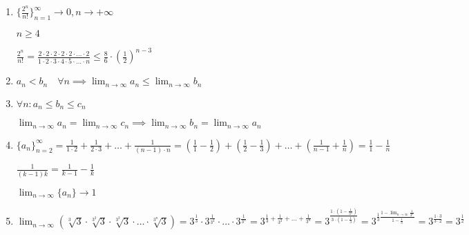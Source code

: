 \begin{enumerate}
\begin{proof}
            $n - 1 \geq \frac{n}{2} \quad (\forall n \geq 2)$
            
            $\lambda^n = (1 + \underbrace{\lambda - 1}_{> 0})^n
            = \sum_{i = 0}^{n} \binom{n}{i} (\lambda - 1)^i
            \overset{i = 2}{\geq} \binom{n}{2} (\lambda - 1)^2
            \overset{n \geq 2}{\geq} \underbracket{\frac{(\lambda - 1)^2}{4}}_\text{константа} \cdot n^2$

            $\lambda^n \geq \frac{(\lambda - 1)^2}{4} \cdot n^2$

            $\frac{n}{\lambda^n} \leq \frac{n}{\frac{(\lambda - 1)^2}{4}} \cdot \frac{1}{n^2} = \frac{4}{(\lambda - 1)^2} \cdot \frac{1}{n} \to 0$
        \end{proof}

    \item
        $\{\frac{2^n}{n!}\}_{n = 1}^\infty \to 0, n \to +\infty$

        $n \geq 4$

        $\frac{2^n}{n!} = \frac{2 \cdot 2 \cdot 2 \cdot 2 \cdot 2 \cdot \dots \cdot 2}{1 \cdot 2 \cdot 3 \cdot 4 \cdot 5 \cdot \dots \cdot n} 
        \leq \frac{8}{6} \cdot \left( \frac{1}{2} \right)^{n - 3}$

    \item
        $a_n < b_n \quad \forall n \implies \lim_{n \to \infty} a_n \leq \lim_{n \to \infty} b_n $

    \item
        \begin{theorem}
            $\forall n : a_n \leq b_n \leq c_n$

            $\lim_{n \to \infty} a_n = \lim_{n \to \infty} c_n \implies \lim_{n \to \infty} b_n = \lim_{n \to \infty} a_n$
        \end{theorem}

    \item
        $\{ a_n \}_{n = 2}^\infty = \frac{1}{1 \cdot 2} + \frac{1}{2 \cdot 3} + \dots + \frac{1}{(n - 1) \cdot n}
        = \left(\frac{1}{1} - \frac{1}{2}\right) + \left(\frac{1}{2} - \frac{1}{3}\right) + \dots + \left(\frac{1}{n - 1} + \frac{1}{n}\right) 
        = \frac{1}{1} - \frac{1}{n}$

        $\frac{1}{(k - 1)k} = \frac{1}{k - 1} - \frac{1}{k}$
         

        $\lim_{n \to \infty} \{ a_n \} \to 1$

    \item 
        $\lim_{n \to \infty} \left(\sqrt[3]{3} \cdot \sqrt[3^2]{3} \cdot \sqrt[3^3]{3} \cdot \dots \cdot \sqrt[3^n]{3} \right)
        = 3^{\frac{1}{3}} \cdot 3^{\frac{1}{3^2}} \cdot \dots \cdot 3^{\frac{1}{3^n}} 
        = 3^{\frac{1}{3} + \frac{1}{3^2} + \dots + \frac{1}{3^n}} 
        = 3^{\frac{1 \cdot (1 - \frac{1}{3^n})}{3 \cdot (1 - \frac{1}{3})}} = 3^{\frac{1}{3} \frac{1 - \lim_{n \to \infty} \frac{1}{3^n}}{1 - \frac{1}{3}}}
        = 3^{\frac{1 \cdot 3}{3 \cdot 2}} 
        = 3^{\frac{1}{2}}$
\end{enumerate}
